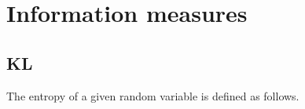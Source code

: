 \documentclass[lettersize,onecolumn]{IEEEtran}
\begin{document}
\section{Information measures}
%
%

\subsection{KL}
The entropy of a given random variable is defined as follows.
\end{document}
